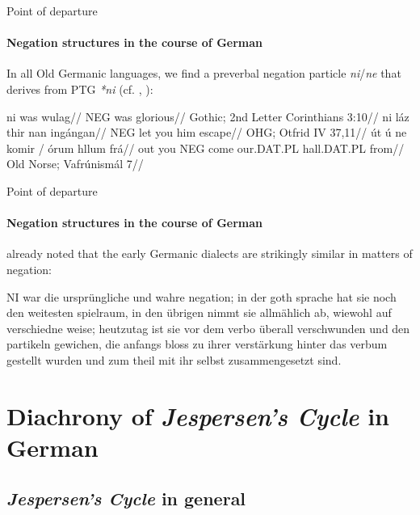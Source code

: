 \documentclass[xcolor=table, compress, %
handout
]{beamer}
\begin{document}
\begin{frame}{Point of departure}
\framesubtitle{Negation structures in the course of German}

In all Old Germanic languages, we find a preverbal negation particle \textit{ni}/\textit{ne} that derives from PTG \textit{*ni} (cf. \citealt{Eythorsson1995}, \citealt{Eythorsson2002}):

\pex
\a
\begingl
\gla ni was wul\th ag//
\glb \textsc{NEG} was glorious//
\glft Gothic; 2nd Letter Corinthians 3:10//
\endgl
\a
\begingl
\gla ni láz thir nan ingángan//
\glb \textsc{NEG} let you him escape//
\glft OHG; Otfrid IV 37,11//
\endgl
\a
\begingl
\gla út \th ú ne komir / órum hllum frá//
\glb out you \textsc{NEG} come {} our.\textsc{DAT.PL} hall.\textsc{DAT.PL} from//
\glft Old Norse; Vaf\th rú\dh nismál 7//
\endgl
\xe

\end{frame}

\begin{frame}{Point of departure}
\framesubtitle{Negation structures in the course of German}

\citet[690]{Grimm1890} already noted that the early Germanic dialects are strikingly similar in matters of negation:
\bigskip
\par
\begingroup
\leftskip=0.5cm %
\noindent %
\begingroup
\rightskip=0.5cm %
\noindent %

\begin{small}
NI war die ursprüngliche und wahre negation; in der goth sprache hat sie noch den weitesten spielraum, in den übrigen nimmt sie allmählich ab, wiewohl auf verschiedne weise; heutzutag ist sie vor dem verbo überall verschwunden und den partikeln gewichen, die anfangs bloss zu ihrer verstärkung hinter das verbum gestellt wurden und zum theil mit ihr selbst zusammengesetzt sind. 
\end{small}

\par
\endgroup
\par
\endgroup 

\end{frame}

\section{Diachrony of \textit{Jespersen's Cycle} in German}
\subsection{\textit{Jespersen's Cycle} in general}
\end{document}
